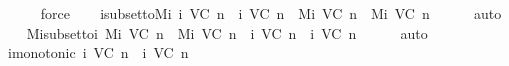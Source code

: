 \begin{isabellebody}
%
\isadelimproof
\ \ \ \ %
\endisadelimproof
%
\isatagproof
{}\isamarkupfalse%
\ force%
\endisatagproof
{\isafoldproof}%
%
\isadelimproof
\isanewline
%
\endisadelimproof
\isanewline
\ \ \isamarkupfalse%
\ {\isasymSigma}i{\isacharunderscore}subset{\isacharunderscore}to{\isacharunderscore}Mi{\isacharcolon}\ {\isachardoublequoteopen}{\isasymSigma}{\isacharunderscore}i\ {\isacharparenleft}V{\isacharcomma}C{\isacharcomma}{\isasymepsilon}{\isacharparenright}\ n\ {\isasymsubseteq}\ {\isasymSigma}{\isacharunderscore}i\ {\isacharparenleft}V{\isacharcomma}C{\isacharcomma}{\isasymepsilon}{\isacharparenright}\ {\isacharparenleft}n{\isacharplus}{}{\isacharparenright}\ {\isasymLongrightarrow}\ M{\isacharunderscore}i\ {\isacharparenleft}V{\isacharcomma}C{\isacharcomma}{\isasymepsilon}{\isacharparenright}\ n\ {\isasymsubseteq}\ M{\isacharunderscore}i\ {\isacharparenleft}V{\isacharcomma}C{\isacharcomma}{\isasymepsilon}{\isacharparenright}\ {\isacharparenleft}n{\isacharplus}{}{\isacharparenright}{\isachardoublequoteclose}\isanewline
%
\isadelimproof
\ \ \ \ %
\endisadelimproof
%
\isatagproof
{}\isamarkupfalse%
\ auto%
\endisatagproof
{\isafoldproof}%
%
\isadelimproof
\isanewline
%
\endisadelimproof
\isanewline
\ \ \isamarkupfalse%
\ Mi{\isacharunderscore}subset{\isacharunderscore}to{\isacharunderscore}{\isasymSigma}i{\isacharcolon}\ {\isachardoublequoteopen}M{\isacharunderscore}i\ {\isacharparenleft}V{\isacharcomma}C{\isacharcomma}{\isasymepsilon}{\isacharparenright}\ n\ {\isasymsubseteq}\ M{\isacharunderscore}i\ {\isacharparenleft}V{\isacharcomma}C{\isacharcomma}{\isasymepsilon}{\isacharparenright}\ {\isacharparenleft}n{\isacharplus}{}{\isacharparenright}\ {\isasymLongrightarrow}\ {\isasymSigma}{\isacharunderscore}i\ {\isacharparenleft}V{\isacharcomma}C{\isacharcomma}{\isasymepsilon}{\isacharparenright}\ {\isacharparenleft}n{\isacharplus}{}{\isacharparenright}\ {\isasymsubseteq}\ {\isasymSigma}{\isacharunderscore}i\ {\isacharparenleft}V{\isacharcomma}C{\isacharcomma}{\isasymepsilon}{\isacharparenright}\ {\isacharparenleft}n{\isacharplus}{}{\isacharparenright}{\isachardoublequoteclose}\isanewline
%
\isadelimproof
\ \ \ \ %
\endisadelimproof
%
\isatagproof
{}\isamarkupfalse%
\ auto%
\endisatagproof
{\isafoldproof}%
%
\isadelimproof
\isanewline
%
\endisadelimproof
\isanewline
\ \ \isamarkupfalse%
\ {\isasymSigma}i{\isacharunderscore}monotonic{\isacharcolon}\ {\isachardoublequoteopen}{\isasymSigma}{\isacharunderscore}i\ {\isacharparenleft}V{\isacharcomma}C{\isacharcomma}{\isasymepsilon}{\isacharparenright}\ n\ {\isasymsubseteq}\ {\isasymSigma}{\isacharunderscore}i\ {\isacharparenleft}V{\isacharcomma}C{\isacharcomma}{\isasymepsilon}{\isacharparenright}\ {\isacharparenleft}n{\isacharplus}{}{\isacharparenright}{\isachardoublequoteclose}\isanewline

\end{isabellebody}
